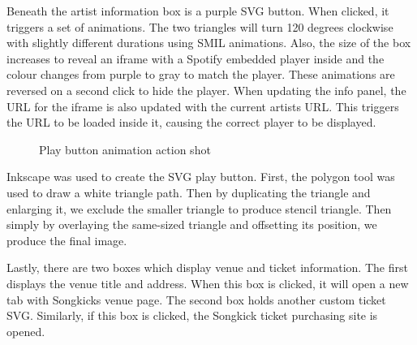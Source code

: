 \documentclass[10pt]{article}
\begin{document}
                Beneath the artist information box is a purple SVG button. When clicked, it triggers a set of animations. The two triangles will turn 120 degrees clockwise with slightly different durations using SMIL animations. Also, the size of the box increases to reveal an iframe with a Spotify embedded player inside and the colour changes from purple to gray to match the player. These animations are reversed on a second click to hide the player. When updating the info panel, the URL for the iframe is also updated with the current artist\textquotesingle s URL. This triggers the URL to be loaded inside it, causing the correct player to be displayed.

                \begin{figure}[!ht]
                  \centering
                  \caption{Play button animation action shot}
                \end{figure}

                Inkscape was used to create the SVG play button. First, the polygon tool was used to draw a white triangle path. Then by duplicating the triangle and enlarging it, we exclude the smaller triangle to produce stencil triangle. Then simply by overlaying the same-sized triangle and offsetting its position, we produce the final image.

                Lastly, there are two boxes which display venue and ticket information. The first displays the venue title and address. When this box is clicked, it will open a new tab with Songkick\textquotesingle s venue page. The second box holds another custom ticket SVG. Similarly, if this box is clicked, the Songkick ticket purchasing site is opened.
\end{document}
